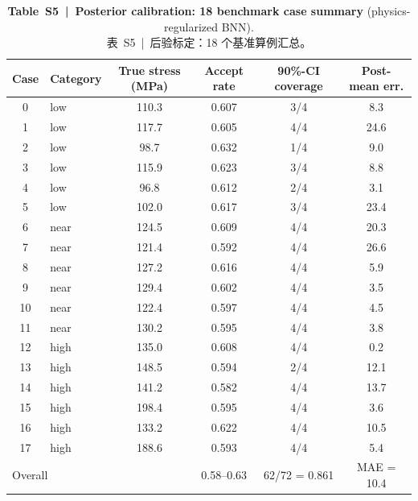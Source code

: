 \documentclass[11pt,a4paper]{article}
\begin{document}
\begin{table}[htbp]
\centering
\caption{\textbf{Table~S5~|~Posterior calibration: 18 benchmark case
summary} (physics-regularized BNN).\\
\small 表~S5~|~后验标定：18 个基准算例汇总。}
\label{tab:S5}
\smallskip
\small
\begin{tabular}{clcccc}
\toprule
Case & Category & True stress (MPa) & Accept rate & 90\%-CI coverage & Post-mean err. \\
\midrule
 0 & low  & 110.3 & 0.607 & 3/4 &  8.3 \\
 1 & low  & 117.7 & 0.605 & 4/4 & 24.6 \\
 2 & low  &  98.7 & 0.632 & 1/4 &  9.0 \\
 3 & low  & 115.9 & 0.623 & 3/4 &  8.8 \\
 4 & low  &  96.8 & 0.612 & 2/4 &  3.1 \\
 5 & low  & 102.0 & 0.617 & 3/4 & 23.4 \\
 6 & near & 124.5 & 0.609 & 4/4 & 20.3 \\
 7 & near & 121.4 & 0.592 & 4/4 & 26.6 \\
 8 & near & 127.2 & 0.616 & 4/4 &  5.9 \\
 9 & near & 129.4 & 0.602 & 4/4 &  3.5 \\
10 & near & 122.4 & 0.597 & 4/4 &  4.5 \\
11 & near & 130.2 & 0.595 & 4/4 &  3.8 \\
12 & high & 135.0 & 0.608 & 4/4 &  0.2 \\
13 & high & 148.5 & 0.594 & 2/4 & 12.1 \\
14 & high & 141.2 & 0.582 & 4/4 & 13.7 \\
15 & high & 198.4 & 0.595 & 4/4 &  3.6 \\
16 & high & 133.2 & 0.622 & 4/4 & 10.5 \\
17 & high & 188.6 & 0.593 & 4/4 &  5.4 \\
\midrule
\multicolumn{2}{l}{Overall} & & 0.58--0.63 & 62/72 = 0.861 & MAE = 10.4 \\
\bottomrule
\end{tabular}
\end{table}
\end{document}
